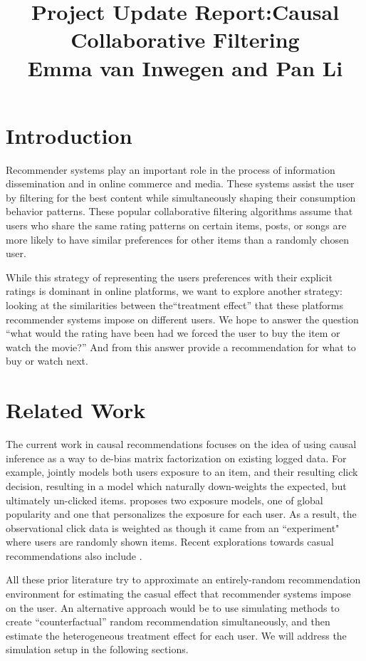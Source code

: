 \documentclass{NSF}
\begin{document}
\title{Project Update Report:Causal Collaborative Filtering\\Emma van Inwegen and Pan Li}

\section{Introduction}
Recommender systems play an important role in the process of information dissemination and in online commerce and media. These systems assist the user by filtering for the best content while simultaneously shaping their consumption behavior patterns. These popular collaborative filtering algorithms assume that users who share the same rating patterns on certain items, posts, or songs are more likely to have similar preferences for other items than a randomly chosen user. 

While this strategy of representing the users preferences with their explicit ratings is dominant in online platforms, we want to explore another strategy: looking at the similarities between the``treatment effect” that these platforms recommender systems impose on different users. We hope to answer the question ``what would the rating have been had we forced the user to buy the item or watch the movie?” And from this answer provide a recommendation for what to buy or watch next.

\section{Related Work}
The current work in causal recommendations focuses on the idea of using causal inference as a way to de-bias matrix factorization on existing logged data. For example, \cite{liang2016causal} jointly models both users exposure to an item, and their resulting click decision, resulting in a model which naturally down-weights the expected, but ultimately un-clicked items. \cite{liang2016modeling} proposes two exposure models, one of global popularity and one that personalizes the exposure for each user. As a result, the observational click data is weighted as though it came from an ``experiment" where users are randomly shown items. Recent explorations towards casual recommendations also include \cite{bonner2018causal,wang2018deconfounded}.

All these prior literature try to approximate an entirely-random recommendation environment for estimating the casual effect that recommender systems impose on the user. An alternative approach would be to use simulating methods to create ``counterfactual'' random recommendation simultaneously, and then estimate the heterogeneous treatment effect for each user. We will address the simulation setup in the following sections.
\end{document}
